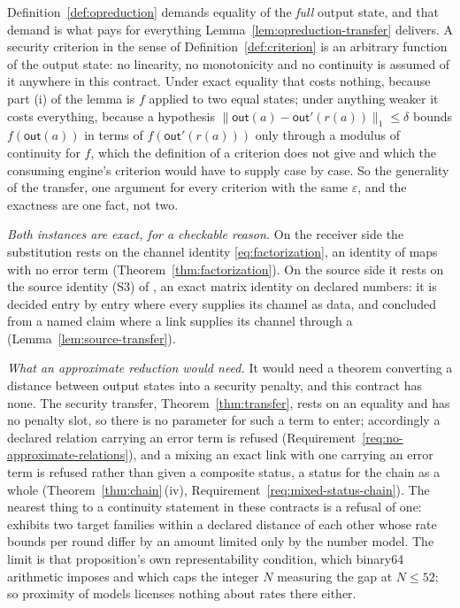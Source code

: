 \begin{remark}\label{rem:why-exact}
Definition~\ref{def:opreduction} demands equality of the \emph{full} output
state, and that demand is what pays for everything
Lemma~\ref{lem:opreduction-transfer} delivers. A security criterion in the
sense of Definition~\ref{def:criterion} is an arbitrary function of the output
state: no linearity, no monotonicity and no continuity is assumed of it
anywhere in this contract. Under exact equality that costs nothing, because
part (i) of the lemma is $f$ applied to two equal states; under anything
weaker it costs everything, because a hypothesis
$\|\mathsf{out}(a)-\mathsf{out}'(r(a))\|_1\le\delta$ bounds
$f(\mathsf{out}(a))$ in terms of $f(\mathsf{out}'(r(a)))$ only through a
modulus of continuity for $f$, which the definition of a criterion does not
give and which the consuming engine's criterion would have to supply case by
case. So the generality of the transfer, one argument for every criterion with
the same $\varepsilon$, and the exactness are one fact, not two.

\emph{Both instances are exact, for a checkable reason.} On the receiver side
the substitution rests on the channel identity \eqref{eq:factorization}, an
identity of maps with no error term (Theorem~\ref{thm:factorization}). On the
source side it rests on the source identity (S3) of
, an exact matrix identity on declared
numbers: it is decided entry by entry where every  supplies
its channel as data, and concluded from a named claim where a link supplies
its channel through a 
(Lemma~\ref{lem:source-transfer}).

\emph{What an approximate reduction would need.} It would need a theorem
converting a distance between output states into a security penalty, and this
contract has none. The security transfer, Theorem~\ref{thm:transfer}, rests on
an equality and has no penalty slot, so there is no parameter for such a term
to enter; accordingly a declared relation carrying an error term is refused
(Requirement~\ref{req:no-approximate-relations}), and a 
mixing an exact link with one carrying an error term is refused rather than
given a composite status, a status for the chain as a whole
(Theorem~\ref{thm:chain}\,(iv), Requirement~\ref{req:mixed-status-chain}).
The nearest thing to a continuity statement in these contracts is a refusal of
one:  exhibits two
 target families within a declared distance of each
other whose rate bounds per round differ by an amount limited only by the
number model. The limit is that proposition's own representability condition,
which binary64 arithmetic imposes and which caps the integer $N$ measuring the
gap at $N\le52$; so proximity of models licenses nothing about rates there
either.


\end{remark}
